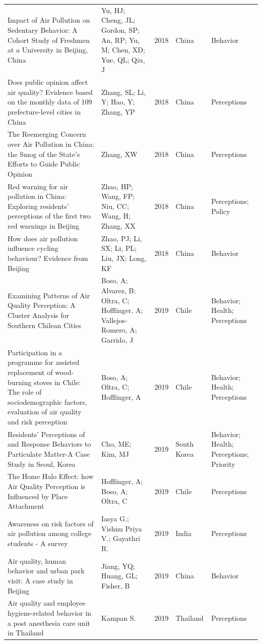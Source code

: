{\begin{longtable}[t]{p{6cm}p{3cm}lp{3cm}p{3cm}}
Impact of Air Pollution on Sedentary Behavior: A Cohort Study of Freshmen at a University in Beijing, China & Yu, HJ; Cheng, JL; Gordon, SP; An, RP; Yu, M; Chen, XD; Yue, QL; Qiu, J & 2018 & China & Behavior\\
Does public opinion affect air quality? Evidence based on the monthly data of 109 prefecture-level cities in China & Zhang, SL; Li, Y; Hao, Y; Zhang, YP & 2018 & China & Perceptions\\
The Reemerging Concern over Air Pollution in China: the Smog of the State's Efforts to Guide Public Opinion & Zhang, XW & 2018 & China & Perceptions\\
\addlinespace
Red warning for air pollution in China: Exploring residents' perceptions of the first two red warnings in Beijing & Zhao, HP; Wang, FP; Niu, CC; Wang, H; Zhang, XX & 2018 & China & Perceptions; Policy\\
How does air pollution influence cycling behaviour? Evidence from Beijing & Zhao, PJ; Li, SX; Li, PL; Liu, JX; Long, KF & 2018 & China & Behavior\\
Examining Patterns of Air Quality Perception: A Cluster Analysis for Southern Chilean Cities & Boso, A; Alvarez, B; Oltra, C; Hofflinger, A; Vallejos-Romero, A; Garrido, J & 2019 & Chile & Behavior; Health; Perceptions\\
Participation in a programme for assisted replacement of wood-burning stoves in Chile: The role of sociodemographic factors, evaluation of air quality and risk perception & Boso, A; Oltra, C; Hofflinger, A & 2019 & Chile & Behavior; Health; Perceptions\\
Residents' Perceptions of and Response Behaviors to Particulate Matter-A Case Study in Seoul, Korea & Cho, ME; Kim, MJ & 2019 & South Korea & Behavior; Health; Perceptions; Priority\\
\addlinespace
The Home Halo Effect: how Air Quality Perception is Influenced by Place Attachment & Hofflinger, A; Boso, A; Oltra, C & 2019 & Chile & Perceptions\\
Awareness on risk factors of air pollution among college students - A survey & Iasya G.; Vishnu Priya V.; Gayathri R. & 2019 & India & Perceptions\\
Air quality, human behavior and urban park visit: A case study in Beijing & Jiang, YQ; Huang, GL; Fisher, B & 2019 & China & Behavior\\
Air quality and employee hygiene-related behavior in a post anesthesia care unit in Thailand & Kampan S. & 2019 & Thailand & Perceptions\\

\end{longtable}}
